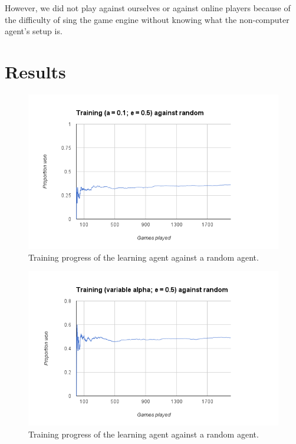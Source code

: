 \documentclass[letterpaper]{article}
\begin{document}
However, we did not play against ourselves or against online players because of the difficulty of sing the game engine
without knowing what the non-computer agent's setup is.

\section{Results}

\begin{figure}
  \vspace{-2em}
  \begin{center}
    \includegraphics[width=\textwidth]{a1e5training.png}
    \vspace{-3em}
  \caption{Training progress of the learning agent against a random agent.\label{a1e5}}
  \vspace{-1em}
  \end{center}
\end{figure}

\begin{figure}
  \vspace{-2em}
  \begin{center}
    \includegraphics[width=\textwidth]{varae5training.png}
    \vspace{-3em}
  \caption{Training progress of the learning agent against a random agent.\label{a1e5}}
  \vspace{-1em}
  \end{center}
\end{figure}
\end{document}
